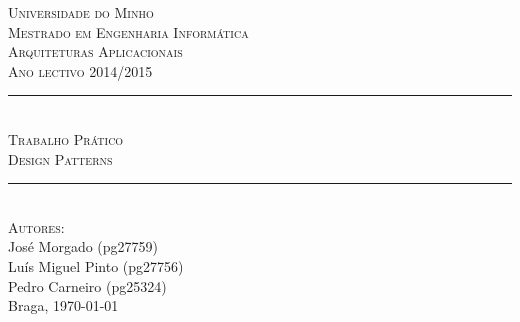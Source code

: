 \begin{titlepage}
\onehalfspacing

\newcommand{\HRule}{\rule{\linewidth}{0.5mm}} %

\center %


\textsc{\LARGE Universidade do Minho}\\[1.5cm] %
\textsc{\Large Mestrado em Engenharia Informática}\\[0.5cm] %
\textsc{\large Arquiteturas Aplicacionais}\\[0.5cm] %
\textsc{Ano lectivo 2014/2015}\\[0.5cm]


\HRule \\[0.4cm]
\textsc{\Large Trabalho Prático}\\[0.4cm] %
\textsc{ \large Design Patterns}\\[0.4cm] %
\HRule \\[1.5cm]


\textsc{\large Autores:}\\
{
José Morgado (pg27759) \\
Luís Miguel Pinto (pg27756) \\
Pedro Carneiro (pg25324)
}\\[1cm] %


Braga, {\large \today}\\[1cm] %


\end{titlepage}

